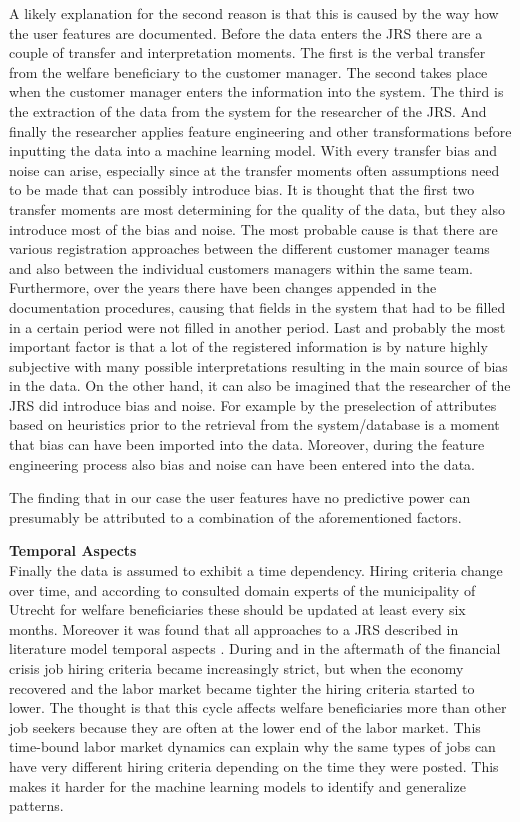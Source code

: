 A likely explanation for the second reason is that this is caused by the way how the user features are documented.
Before the data enters the JRS there are a couple of transfer and interpretation moments. 
The first is the verbal transfer from the welfare beneficiary to the customer manager.
The second takes place when the customer manager enters the information into the system.
The third is the extraction of the data from the system for the researcher of the JRS.
And finally the researcher applies feature engineering and other transformations before inputting the data into a machine learning model.
With every transfer bias and noise can arise, especially since at the transfer moments often assumptions need to be made that can possibly introduce bias.
It is thought that the first two transfer moments are most determining for the quality of the data, but they also introduce most of the bias and noise. The most probable cause is that there are various registration approaches between the different customer manager teams and also between the individual customers managers within the same team. 
Furthermore, over the years there have been changes appended in the documentation procedures, causing that fields in the system that had to be filled in a certain period were not filled  in another period.
Last and probably the most important factor is that a lot of the registered information is by nature highly subjective with many possible interpretations resulting in the main source of bias in the data. 
On the other hand, it can also be imagined that the researcher of the JRS did introduce bias and noise.
For example by the preselection of attributes based on heuristics prior to the retrieval from the system/database is a moment that bias can have been imported into the data.
Moreover, during the feature engineering process also bias and noise can have been entered into the data.

The finding that in our case the user features have no predictive power can presumably be attributed to a combination of the aforementioned factors. 

\noindent
\textbf{Temporal Aspects} \\
Finally the data is assumed to exhibit a time dependency.
Hiring criteria change over time, and according to consulted domain experts of the municipality of Utrecht for welfare beneficiaries these should be updated at least every six months. 
Moreover it was found that all approaches to a JRS described in literature model temporal aspects  \cite{kenthapadi2017personalized, T.Al-Otaibi2012ASystems, Zheng2012JobSurvey, hong2013job}.
During and in the aftermath of the financial crisis job hiring criteria became increasingly strict, but when the economy recovered and the labor market became tighter the hiring criteria started to lower. 
The thought is that this cycle affects welfare beneficiaries more than other job seekers because they are often at the lower end of the labor market.
This time-bound labor market dynamics can explain why the same types of jobs can have very different hiring criteria depending on the time they were posted.
This makes it harder for the machine learning models to identify and generalize patterns.

